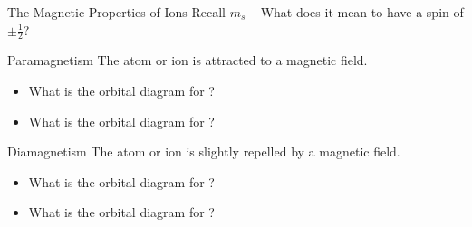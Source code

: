 \documentclass[handout]{beamer}
\begin{document}
\begin{frame}[t]{The Magnetic Properties of Ions}
	Recall $m_s$ -- What does it mean to have a spin of $\pm\frac{1}{2}$?
\end{frame}

\begin{frame}[t]{Paramagnetism}
	The atom or ion is \alert{attracted} to a magnetic field.
	\begin{itemize}
		\item What is the orbital diagram for ?

			\vfill

		\item What is the orbital diagram for ?

			\vfill
	\end{itemize}

\end{frame}

\begin{frame}[t]{Diamagnetism}
	The atom or ion is \alert{slightly repelled} by a magnetic field.
	\begin{itemize}
		\item What is the orbital diagram for ?

			\vfill

		\item What is the orbital diagram for ?

			\vfill
	\end{itemize}


\end{frame}
\end{document}

